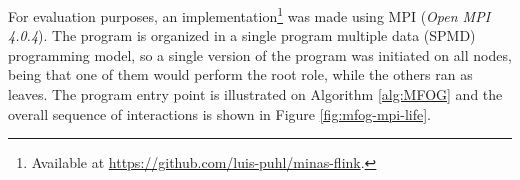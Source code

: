 


For evaluation purposes, an \mfog implementation\footnote{Available at
\url{https://github.com/luis-puhl/minas-flink}.} was made using MPI (\emph{Open
MPI 4.0.4}).
The program is organized in a single program multiple data (SPMD)
programming model, so a single version of the \mfog program was initiated on all
nodes, being that one of them would perform the root role, while the others ran
as leaves. The program entry point is illustrated on Algorithm \ref{alg:MFOG}
and the overall sequence of interactions is shown in Figure \ref{fig:mfog-mpi-life}.

